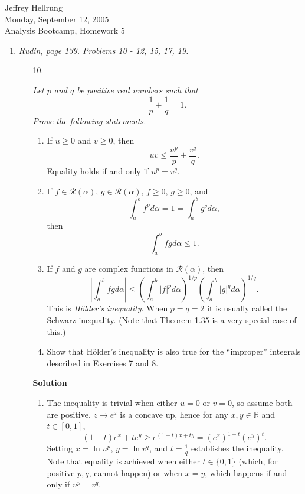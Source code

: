 \documentclass{article}
\begin{document}
\begin{flushright}
Jeffrey Hellrung \\
Monday, September 12, 2005 \\
Analysis Bootcamp, Homework 5 \\
\end{flushright}


\begin{enumerate}

\item {\em Rudin, page 139.  Problems 10 - 12, 15, 17, 19.}

\begin{itemize}

\item[10.] {\em Let \(p\) and \(q\) be positive real numbers such that
\[\frac{1}{p} + \frac{1}{q} = 1.\]
Prove the following statements.
\begin{enumerate}
\item If \(u \geq 0\) and \(v \geq 0\), then
\[uv \leq \frac{u^p}{p} + \frac{v^q}{q}.\]
Equality holds if and only if \(u^p = v^q\).
\item If \(f \in \mathcal{R}(\alpha)\), \(g \in \mathcal{R}(\alpha)\), \(f \geq 0\), \(g \geq 0\), and
\[\int_a^b f^p d\alpha = 1 = \int_a^b g^q d\alpha,\]
then
\[\int_a^b fg d\alpha \leq 1.\]
\item If \(f\) and \(g\) are complex functions in \(\mathcal{R}(\alpha)\), then
\[\left| \int_a^b fg d\alpha \right| \leq \left( \int_a^b |f|^p d\alpha \right)^{1/p} \left( \int_a^b |g|^q d\alpha \right)^{1/q}.\]
This is {\em H\"older's inequality}.  When \(p = q = 2\) it is usually called the Schwarz inequality.  (Note that Theorem 1.35 is a very special case of this.)
\item Show that H\"older's inequality is also true for the ``improper'' integrals described in Exercises 7 and 8.
\end{enumerate}}

{\bf Solution}

\begin{enumerate}
\item The inequality is trivial when either \(u = 0\) or \(v = 0\), so assume both are positive.  \(z \to e^z\) is a concave up, hence for any \(x,y \in \mathbb{R}\) and \(t \in [0,1]\),
\[(1 - t) e^x + t e^y \geq e^{(1 - t)x + ty} = \left( e^x \right)^{1 - t} \left( e^y \right)^t.\]
Setting \(x = \ln u^p\), \(y = \ln v^q\), and \(t = \frac{1}{q}\) establishes the inequality.  Note that equality is achieved when either \(t \in \{0,1\}\) (which, for positive \(p,q\), cannot happen) or when \(x = y\), which happens if and only if \(u^p = v^q\).


\end{enumerate}
\end{itemize}
\end{enumerate}
\end{document}
